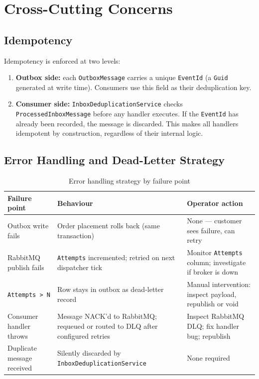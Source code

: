 \chapter{Cross-Cutting Concerns}
\label{ch:crosscutting}

\section{Idempotency}

Idempotency is enforced at two levels:

\begin{enumerate}
    \item \textbf{Outbox side:} each \texttt{OutboxMessage} carries a unique \texttt{EventId} (a \texttt{Guid} generated at write time). Consumers use this field as their deduplication key.
    \item \textbf{Consumer side:} \texttt{InboxDeduplicationService} checks \texttt{ProcessedInboxMessage} before any handler executes. If the \texttt{EventId} has already been recorded, the message is discarded. This makes all handlers idempotent by construction, regardless of their internal logic.
\end{enumerate}

\section{Error Handling and Dead-Letter Strategy}

\begin{table}[H]
\centering
\caption{Error handling strategy by failure point}
\label{tab:error-handling}
\begin{tabularx}{\textwidth}{@{} L{3cm} L{4cm} X @{}}
\toprule
\textbf{Failure point} & \textbf{Behaviour} & \textbf{Operator action} \\
\midrule
Outbox write fails & Order placement rolls back (same transaction) & None — customer sees failure, can retry \\
\addlinespace
RabbitMQ publish fails & \texttt{Attempts} incremented; retried on next dispatcher tick & Monitor \texttt{Attempts} column; investigate if broker is down \\
\addlinespace
\texttt{Attempts > N} & Row stays in outbox as dead-letter record & Manual intervention: inspect payload, republish or void \\
\addlinespace
Consumer handler throws & Message NACK'd to RabbitMQ; requeued or routed to DLQ after configured retries & Inspect RabbitMQ DLQ; fix handler bug; republish \\
\addlinespace
Duplicate message received & Silently discarded by \texttt{Inbox\-Deduplication\-Service} & None required \\
\bottomrule
\end{tabularx}
\end{table}

